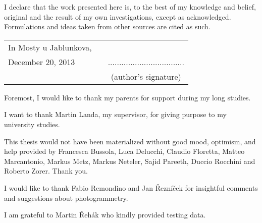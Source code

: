 \newcommand{\odsaditodzhora}{\hskip1pt\vfill}

\odsaditodzhora
{}

I declare that the work presented here is, to the best of my knowledge and
belief, original and the result of my own investigations, except as acknowledged.
Formulations and ideas taken from other sources are cited as such.

 \begin{flushleft}
\begin{tabular}{l m{6cm} c}
In Mosty u Jablunkova, && \\
December 20, 2013
& 
&
..................................
\\
&&
(author’s signature)
\end{tabular}

\end{flushleft}
\newpage


\odsaditodzhora
{}

\noindent Foremost, I would like to thank my parents for support during my long studies. 

I want to thank Martin Landa, my supervisor, for giving purpose to my university studies. 

This thesis would not have  been materialized  without good mood, optimism, and help provided by
 Francesca Bussola,  Luca Delucchi, Claudio Floretta, Matteo Marcantonio, Markus Metz,
 Markus Neteler, Sajid Pareeth, Duccio Rocchini and Roberto Zorer. Thank you.
  
I would like to thank Fabio Remondino and Jan Řezníček for insightful comments and suggestions about photogrammetry. 
 
\noindent I am grateful to Martin Řehák who kindly provided testing data. 


\newpage
